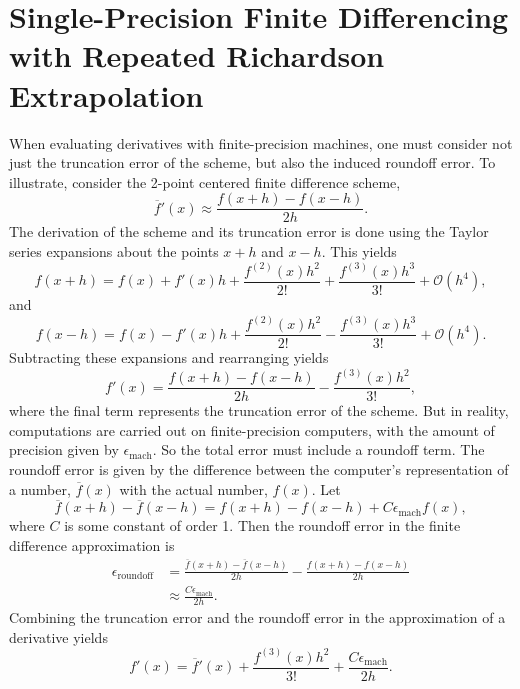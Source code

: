 \documentclass[11pt]{article}
\begin{document}
\section{Single-Precision Finite Differencing with Repeated Richardson Extrapolation}
When evaluating derivatives with finite-precision machines, one must consider not just the truncation error of the scheme,
but also the induced roundoff error. To illustrate, consider the 2-point centered finite difference scheme,
\begin{equation}
\overline{f}'(x) \approx \frac{f(x+h) - f(x-h)}{2h}.
\end{equation}
The derivation of the scheme and its truncation error is done using the Taylor series expansions about the points
 $x+h$ and $x-h$. This yields
\begin{equation}
f(x+h) = f(x) + f'(x) h + \frac{f^{(2)}(x) h^2}{2!} + \frac{f^{(3)}(x) h^3}{3!} + \mathcal{O}(h^4),
\end{equation}
and
\begin{equation}
f(x-h) = f(x) - f'(x) h + \frac{f^{(2)}(x) h^2}{2!} - \frac{f^{(3)}(x) h^3}{3!} + \mathcal{O}(h^4).
\end{equation}
Subtracting these expansions and rearranging yields
\begin{equation}
f'(x) = \frac{ f(x+h) - f(x-h) } { 2 h } - \frac{f^{(3)}(x) h^2}{3!},
\end{equation}
where the final term represents the truncation error of the scheme. But in reality, computations are carried out on
finite-precision computers, with the amount of precision given by $\epsilon_{\text{mach}}$. So the total error must 
include a roundoff term. The roundoff error is given by the difference
between the computer's representation of a number, $\overline{f}(x)$ with the actual number, $f(x)$. Let
\begin{equation}
\overline{f}(x+h) - \overline{f}(x-h) =  f(x+h) - f(x-h) + C \epsilon_{\text{mach}} f(x),
\end{equation}
where $C$ is some constant of order 1. Then the roundoff error in the finite difference approximation is
\begin{align*}
\epsilon_{\text{roundoff}} &= \frac{ \overline{f}(x+h) - \overline{f}(x-h) } { 2 h } - \frac{ f(x+h) - f(x-h) } { 2 h } \\
& \approx \frac{ C \epsilon_{\text{mach}} } {2 h }.
\end{align*}
Combining the truncation error and the roundoff error in the approximation of a derivative yields
\begin{equation}
f'(x) = \overline{f}'(x) + \frac{f^{(3)}(x) h^2}{3!} + \frac{ C \epsilon_{\text{mach}} } {2 h }.
\label{error}
\end{equation}
\end{document}
